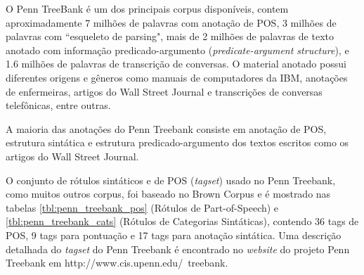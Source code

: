 O Penn TreeBank é um dos principais corpus disponíveis, contem aproximadamente 7 milhões de palavras com anotação de POS, 3 milhões de palavras com ``esqueleto de parsing", mais de 2 milhões de palavras de texto anotado com informação predicado-argumento (\emph{predicate-argument structure}), e 1.6 milhões de palavras de transcrição de conversas. O material anotado possui diferentes origens e gêneros como manuais de computadores da IBM, anotações de enfermeiras, artigos do Wall Street Journal e transcrições de conversas telefônicas, entre outras.

A maioria das anotações do Penn Treebank consiste em anotação de POS, estrutura sintática e estrutura predicado-argumento dos textos escritos como os artigos do Wall Street Journal.

O conjunto de rótulos sintáticos e de POS (\emph{tagset}) usado no Penn Treebank, como muitos outros corpus, foi baseado no Brown Corpus e é mostrado nas tabelas \ref{tbl:penn_treebank_pos} (Rótulos de Part-of-Speech) e \ref{tbl:penn_treebank_cats} (Rótulos de Categorias Sintáticas), contendo 36 tags de POS, 9 tags para pontuação e 17 tags para anotação sintática. Uma descrição detalhada do \emph{tagset} do Penn Treebank é encontrado no \emph{website} do projeto Penn Treebank em http://www.cis.upenn.edu/~treebank.

